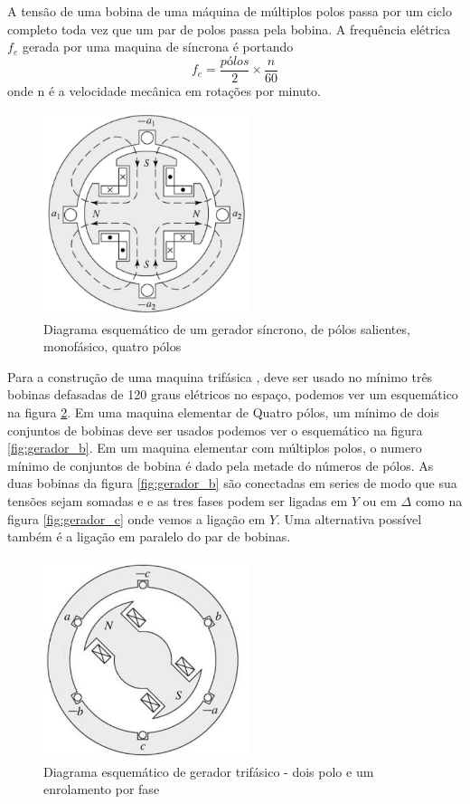 \documentclass[
	12pt,				%
	openright,			%
	twoside,			%
	a4paper,			%
	english,			%
	french,				%
	spanish,			%
	brazil,				%
	]{abntex2}
\begin{document}
A tensão de uma bobina de uma máquina de múltiplos polos passa por um ciclo completo toda vez que um par de polos passa pela bobina. A frequência elétrica $f_{e}$ gerada por uma maquina de síncrona é  portando\begin{equation}
f_{e} = \frac{pólos}{2} \times  \frac{n}{60} 
\end{equation} onde n é a velocidade mecânica em rotações por minuto.


\begin{figure}[H]
    \centering
    \includegraphics[width=6cm]{img/gerador_mono_4.png}
    \caption{Diagrama esquemático de um gerador síncrono, de pólos
salientes, monofásico, quatro pólos}
    \label{fig:gerador_mono_4}
\end{figure}

Para a construção de uma maquina trifásica , deve ser usado no mínimo três bobinas defasadas de 120 graus elétricos no espaço, podemos ver um esquemático na figura \ref{fig:gerador_a}. Em uma maquina elementar de Quatro pólos, um mínimo de dois conjuntos de bobinas deve ser usados podemos ver o esquemático na figura \ref{fig:gerador_b}.  Em um maquina elementar com múltiplos polos, o numero mínimo de conjuntos de bobina é dado pela metade do números de pólos.
As duas bobinas da figura \ref{fig:gerador_b} são conectadas em series de modo que sua tensões sejam somadas e e as tres fases podem ser ligadas em $Y$ ou em $\Delta$ como na figura  \ref{fig:gerador_c} onde vemos a ligação em $Y$. Uma alternativa possível também é a ligação em paralelo do par de bobinas.

\begin{figure}[H]
    \centering
    \includegraphics[width=6cm]{img/gerador_s.png}
    \caption{Diagrama esquemático de gerador trifásico - dois polo e um enrolamento por fase}
    \label{fig:gerador_a}
\end{figure}
\end{document}
